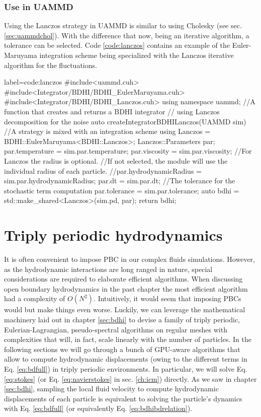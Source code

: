 \documentclass[ twoside,openright,titlepage,numbers=noenddot,%
headinclude,footinclude,cleardoublepage=empty,abstract=on,
BCOR=5mm,paper=b5,fontsize=11pt, dvipsnames
]{scrreprt}
\newcommand{\uammd}{\gls{UAMMD}\xspace}
\begin{document}
\subsection*{Use in UAMMD}
Using the Lanczos strategy in \uammd is similar to using Cholesky (see sec. \ref{sec:uammdchol}). With the difference that now, being an iterative algorithm, a tolerance can be selected.
Code \ref{code:lanczos} contains an example of the Euler-Maruyama integration scheme being specialized with the Lanczos iterative algorithm for the fluctuations.
\begin{code2}    {label=code:lanczos}
#include<uammd.cuh>
#include<Integrator/BDHI/BDHI_EulerMaruyama.cuh>
#include<Integrator/BDHI/BDHI_Lanczos.cuh>
using namespace uammd;
//A function that creates and returns a BDHI integrator
// using Lanczos decomposition for the noise
auto createIntegratorBDHILanczos(UAMMD sim){   
  //A strategy is mixed with an integration scheme
  using Lanczos = BDHI::EulerMaruyama<BDHI::Lanczos>;
  Lanczos::Parameters par;
  par.temperature = sim.par.temperature;
  par.viscosity = sim.par.viscosity;
  //For Lanczos the radius is optional.
  //If not selected, the module will use the individual radius of each particle.
  //par.hydrodynamicRadius = sim.par.hydrodynamicRadius;
  par.dt = sim.par.dt;
  //The tolerance for the stochastic term computation
  par.tolerance = sim.par.tolerance;
  auto bdhi = std::make_shared<Lanczos>(sim.pd, par);
  return bdhi;
}
\end{code2}

\newpage
\chapter{Triply periodic hydrodynamics}
It is often convenient to impose \gls{PBC} in our complex fluids simulations. However, as the hydrodynamic interactions are long ranged in nature, special considerations are required to elaborate efficient algorithms. When discussing open boundary hydrodynamics in the past chapter the most efficient algorithm had a complexity of $O(N^2)$. Intuitively, it would seem that imposing \glspl{PBC} would but make things even worse. Luckily, we can leverage the mathematical machinery laid out in chapter \ref{sec:bdhi} to devise a family of triply periodic, Eulerian-Lagrangian, pseudo-spectral algorithms on regular meshes with complexities that will, in fact, scale linearly with the number of particles. In the following sections we will go through a bunch of GPU-aware algorithms that allow to compute hydrodynamic displacements (owing to the different terms in Eq. \eqref{eq:bdfull}) in triply periodic environments. In particular, we will solve Eq. \eqref{eq:stokes} (or Eq. \eqref{eq:navierstokes} in sec. \ref{ch:icm}) directly. As we saw in chapter \ref{sec:bdhi}, sampling the local fluid velocity to compute hydrodynamic displacements of each particle is equivalent to solving the particle's dynamics with Eq. \eqref{eq:bdfull} (or equivalently Eq. \eqref{eq:bdhibdrelation}).
\end{document}
